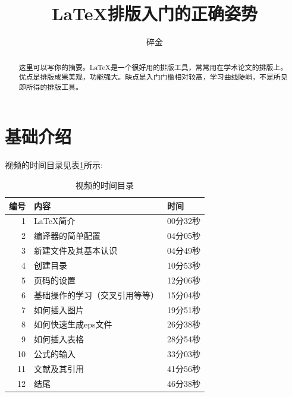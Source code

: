 \documentclass[]{article}	%
\title{\LaTeX 排版入门的正确姿势}
\author{碎金}
\begin{document}
\maketitle	%
\thispagestyle{empty}	%
\clearpage	%

\setcounter{page}{1}	%

\begin{abstract}	%

这里可以写你的摘要。\LaTeX 是一个很好用的排版工具，常常用在学术论文的排版上。优点是排版成果美观，功能强大。缺点是入门门槛相对较高，学习曲线陡峭，不是所见即所得的排版工具。

\end{abstract}

\clearpage
\tableofcontents
\clearpage

\setcounter{page}{1}

\section{基础介绍}
\label{sec.intro}

视频的时间目录见表\ref{tab.tableoftimecontents}所示:
\begin{table}[htbp]
	\centering
	\caption{视频的时间目录}
	\begin{tabular}{rll}
		\toprule
		编号 & 内容 & 时间 \\
		\midrule
		1     & LaTeX简介 & 00分32秒 \\
		2     & 编译器的简单配置 & 04分05秒 \\
		3     & 新建文件及其基本认识 & 04分49秒 \\
		4     & 创建目录  & 10分53秒 \\
		5     & 页码的设置 & 12分06秒 \\
		6     & 基础操作的学习（交叉引用等等） & 15分04秒 \\
		7     & 如何插入图片 & 19分51秒 \\
		8     & 如何快速生成eps文件 & 26分38秒 \\
		9     & 如何插入表格 & 28分54秒 \\
		10    & 公式的输入 & 33分03秒 \\
		11    & 文献及其引用 & 41分56秒 \\
		12    & 结尾    & 46分38秒 \\
		\bottomrule
	\end{tabular}%
	\label{tab.tableoftimecontents}%
\end{table}%
\end{document}

